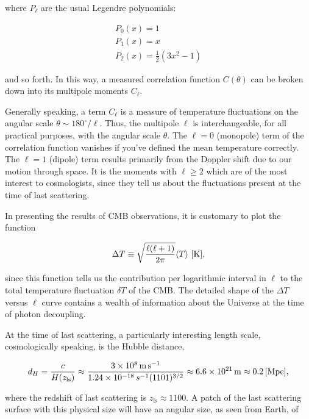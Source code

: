 \documentclass[a4paper,11pt]{article}
\begin{document}
{\noindent}where $P_\ell$ are the usual Legendre polynomials:

\begin{align*}
    P_0(x) = 1 \\
    P_1(x) = x \\
    P_2(x) = \frac{1}{2}(3x^2-1)
\end{align*}

{\noindent}and so forth. In this way, a measured correlation function $C(\theta)$ can be broken down into its multipole moments $C_\ell$.

{\noindent}Generally speaking, a term $C_\ell$ is a measure of temperature fluctuations on the angular scale $\theta\sim180^\circ/\ell$. Thus, the multipole $\ell$ is interchangeable, for all practical purposes, with the angular scale $\theta$. The $\ell=0$ (monopole) term of the correlation function vanishes if you've defined the mean temperature correctly. The $\ell=1$ (dipole) term results primarily from the Doppler shift due to our motion through space. It is the moments with $\ell\geq2$ which are of the most interest to cosmologists, since they tell us about the fluctuations present at the time of last scattering.

{\noindent}In presenting the results of CMB observations, it is customary to plot the function

\begin{align*}
    \Delta T \equiv \sqrt{\frac{\ell(\ell+1)}{2\pi}}\langle T \rangle ~ [{\rm K}],
\end{align*}

{\noindent}since this function tells us the contribution per logarithmic interval in $\ell$ to the total temperature fluctuation $\delta T$ of the CMB. The detailed shape of the $\Delta T$ versus $\ell$ curve contains a wealth of information about the Universe at the time of photon decoupling. 

{\noindent}At the time of last scattering, a particularly interesting length scale, cosmologically speaking, is the Hubble distance,

\begin{align*}
    d_H = \frac{c}{H(z_\mathrm{ls})} \approx \frac{3\times10^8\,{\rm m\,s^{-1}}}{1.24\times10^{-18}\,s^{-1}(1101)^{3/2}} \approx 6.6\times10^{21}\,{\rm m} \approx 0.2\,{[\rm Mpc]},
\end{align*}

{\noindent}where the redshift of last scattering is $z_\mathrm{ls}\approx1100$. A patch of the last scattering surface with this physical size will have an angular size, as seen from Earth, of
\end{document}
